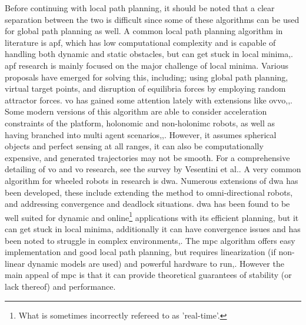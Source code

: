 Before continuing with local path planning, it should be noted that a clear separation between the two is difficult since some of these algorithms can be used for global path planning as well.
A common local path planning algorithm in literature is \ac{apf}, which has low computational complexity and is capable of handling both dynamic and static obstacles, but can get stuck in local minima\:\cite{reda_path_2024},\cite{katona_obstacle_2024}. \ac{apf} research is mainly focused on the major challenge of local minima\:\cite{liu_path_2023}. Various proposals have emerged for solving this, including; using global path planning\:\cite{reda_path_2024}, virtual target points\:\cite{katona_obstacle_2024}, and disruption of equilibria forces by employing random attractor forces\:\cite{katona_obstacle_2024}.
\ac{vo} has gained some attention lately with extensions like \ac{ovvo}\:\cite{kim_study_2016},\cite{cai_mobile_2021},\cite{vesentini_survey_2024}. Some modern versions of this algorithm are able to consider acceleration constraints of the platform\:\cite{van_den_berg_reciprocal_2011}, holonomic and non-holonimc robots\:\cite{martinoli_optimal_2013}, as well as having branched into multi agent scenarios\:\cite{van_den_berg_reciprocal_2008},\cite{cai_mobile_2021},\cite{vesentini_survey_2024}. However, it assumes spherical objects and perfect sensing at all ranges, it can also be computationally expensive, and generated trajectories may not be smooth\:\cite{vesentini_survey_2024}. For a comprehensive detailing of \ac{vo} and \ac{vo} research, see the survey by Vesentini et al.\:\cite{vesentini_survey_2024}.
A very common algorithm for wheeled robots in research is \ac{dwa}\:\cite{katona_obstacle_2024}. Numerous extensions of \ac{dwa} has been developed, these include extending the method to omni-directional robots\:\cite{brock_high-speed_1999}, and addressing convergence and deadlock situations\:\cite{ogren_convergent_2005}. \ac{dwa} has been found to be well suited for dynamic and online\footnote{What is sometimes incorrectly refereed to as 'real-time'.} applications with its efficient planning, but it can get stuck in local minima, additionally it can have convergence issues and has been noted to struggle in complex environments\:\cite{vesentini_survey_2024},\cite{katona_obstacle_2024}.
The \ac{mpc} algorithm offers easy implementation and good local path planning, but requires linearization (if non-linear dynamic models are used) and powerful hardware to run\:\cite{vesentini_survey_2024},\cite{katona_obstacle_2024}. However the main appeal of \ac{mpc} is that it can provide theoretical guarantees of stability (or lack thereof) and performance\:\cite{katona_obstacle_2024}.

